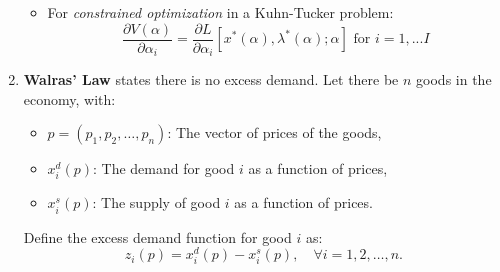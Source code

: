 \documentclass{article}
\begin{document}
\begin{enumerate}
\begin{itemize}
\[            \]
            \item For \textit{constrained optimization} in a Kuhn-Tucker problem:
            \[
            \frac{\partial V(\alpha)}{\partial \alpha_i} = \frac{\partial L}{\partial \alpha_i}[x^*(\alpha), \lambda^*(\alpha); \alpha] \text{ for } i = 1,...I
            \]\textbf{}
        \end{itemize}
    \item \textbf{Walras' Law}\label{WL}
    states there is no excess demand. Let there be \( n \) goods in the economy, with:
    \begin{itemize}
        \item \( p = (p_1, p_2, \dots, p_n) \): The vector of prices of the goods,
        \item \( x_i^d(p) \): The demand for good \( i \) as a function of prices,
        \item \( x_i^s(p) \): The supply of good \( i \) as a function of prices.
    \end{itemize}
        Define the excess demand function for good \( i \) as:
        \[
        z_i(p) = x_i^d(p) - x_i^s(p), \quad \forall i = 1, 2, \dots, n.
        \]
    

\end{enumerate}
\end{document}
